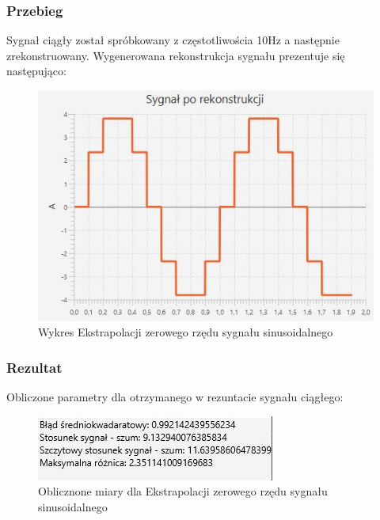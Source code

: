 \documentclass[12pt]{article}
\begin{document}
\subsubsection{Przebieg}
Sygnał ciągły został spróbkowany z częstotliwościa 10Hz a następnie zrekonstruowany.
Wygenerowana rekonstrukcja sygnału prezentuje się następująco:
\begin{figure}[H]
    \centering
	\includegraphics[width=\linewidth]{sygnal_rekonstrukcja_zero.jpg}
    \caption{Wykres Ekstrapolacji zerowego rzędu sygnału sinusoidalnego}
    \label{wykres dla eksperymentu 3}
\end{figure}



\subsubsection{Rezultat}
Obliczone parametry dla otrzymanego w rezuntacie sygnału ciągłego:
\begin{figure}[H]
    \centering
	\includegraphics[width=\linewidth]{wyniki_rekonstrukcja_zero.jpg}
    \caption{Oblicznone miary dla Ekstrapolacji zerowego rzędu sygnału sinusoidalnego}
    \label{wartości dla eksperymentu 3}
\end{figure}
\end{document}
